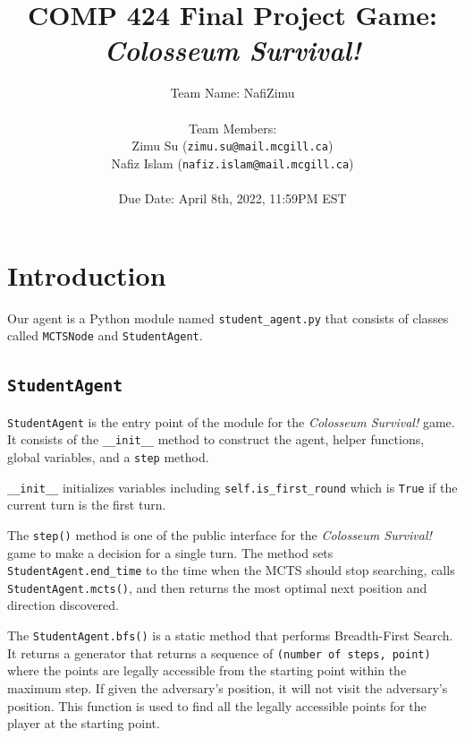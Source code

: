 \documentclass[twoside,11pt]{article}
\begin{document}
\title{COMP 424 Final Project Game: \textit{Colosseum Survival!}}
\author{Team Name: NafiZimu\\\\Team Members: \\Zimu Su (\texttt{zimu.su@mail.mcgill.ca}) \\Nafiz Islam (\texttt{nafiz.islam@mail.mcgill.ca})\\\\Due Date: April 8th, 2022, 11:59PM EST}

\maketitle

\section{Introduction}

Our agent is a Python module named \texttt{student\_agent.py} that consists of classes called \texttt{MCTSNode} and \texttt{StudentAgent}.

\subsection{\texttt{StudentAgent}}

\texttt{StudentAgent} is the entry point of the module for the \textit{Colosseum Survival!} game.
It consists of the \texttt{\_\_init\_\_} method to construct the agent, helper functions, global variables, and a \texttt{step} method.

\texttt{\_\_init\_\_} initializes variables including \texttt{self.is\_first\_round} which is \texttt{True} if the current turn is the first turn.

The \texttt{step()} method is one of the public interface for the \textit{Colosseum Survival!} game to make a decision for a single turn.
The method sets \texttt{StudentAgent.end\_time} to the time when the MCTS should stop searching, calls \texttt{StudentAgent.mcts()}, and then returns the most optimal next position and direction discovered.

The \texttt{StudentAgent.bfs()} is a static method that performs Breadth-First Search.
It returns a generator that returns a sequence of \texttt{(number of steps, point)} where the points are legally accessible from the starting point within the maximum step.
If given the adversary's position, it will not visit the adversary's position.
This function is used to find all the legally accessible points for the player at the starting point.
\end{document}
